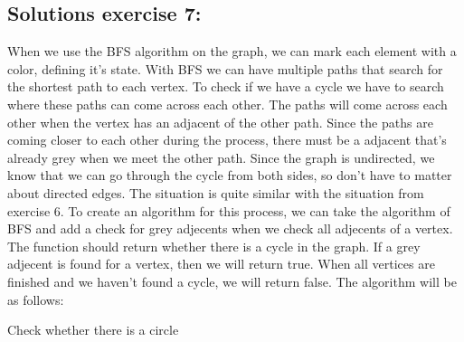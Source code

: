 \documentclass{article}
\begin{document}
\subsection*{Solutions exercise 7:}
When we use the BFS algorithm on the graph, we can mark each element with a color, defining it's state. With BFS we can have multiple paths that search for the shortest path to each vertex. To check if we have a cycle we have to search where these paths can come across each other. The paths will come across each other when the vertex has an adjacent of the other path. Since the paths are coming closer to each other during the process, there must be a adjacent that's already grey when we meet the other path. Since the graph is undirected, we know that we can go through the cycle from both sides, so don't have to matter about directed edges. The situation is quite similar with the situation from exercise 6.
\newline
To create an algorithm for this process, we can take the algorithm of BFS and add a check for grey adjecents when we check all adjecents of a vertex. The function should return whether there is a cycle in the graph. If a grey adjecent is found for a vertex, then we will return true. When all vertices are finished and we haven't found a cycle, we will return false. The algorithm will be as follows:

\begin{algorithm}[htp]
  \DontPrintSemicolon

  \caption{Check whether there is a circle}
\end{algorithm}
\vspace{-0.5cm}
\end{document}

